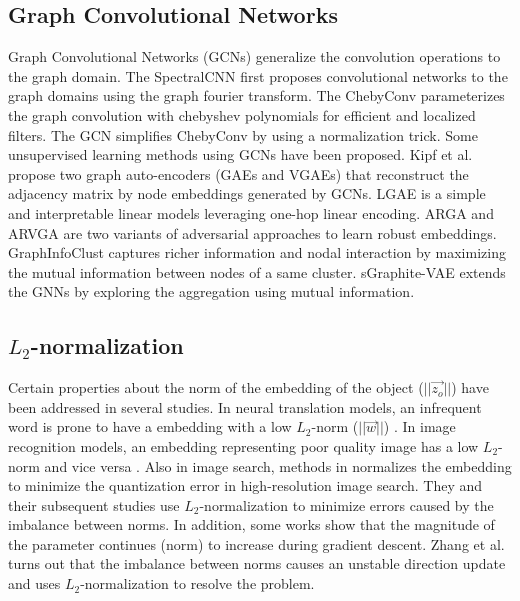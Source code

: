 \documentclass[sigconf]{acmart}
\begin{document}
\subsection{Graph Convolutional Networks}
Graph Convolutional Networks (GCNs) generalize the convolution operations to the graph domain.
The SpectralCNN \cite{bruna2013spectral} first proposes convolutional networks to the graph domains using the graph fourier transform.
The ChebyConv \cite{defferrard2016convolutional} parameterizes the graph convolution with chebyshev polynomials for efficient and localized filters.
The GCN \cite{kipf2016semi} simplifies ChebyConv by using a normalization trick.
Some unsupervised learning methods using GCNs have been proposed.
Kipf et al. \cite{kipf2016variational} propose two graph auto-encoders (GAEs and VGAEs) that reconstruct the adjacency matrix by node embeddings generated by GCNs.
LGAE \cite{salha2020simple} is a simple and interpretable linear models leveraging one-hop linear encoding.
ARGA and ARVGA \cite{pan2018adversarially} are two variants of adversarial approaches to learn robust embeddings.
GraphInfoClust \cite{mavromatis2020graph} captures richer information and nodal interaction by maximizing the mutual information between nodes of a same cluster.
sGraphite-VAE \cite{di2020mutual} extends the GNNs by exploring the aggregation using mutual information.



\subsection{$L_2$-normalization}
Certain properties about the norm of the embedding of the object ($||\vec{z_o}||$) have been addressed in several studies.
In neural translation models, an infrequent word is prone to have a embedding with a low $L_2$-norm ($||\vec{w}||$) \cite{kobayashi2020attention, arefyev2018much, schakel2015measuring, nguyen2017improving, nguyen2019transformers}.
In image recognition models, an embedding representing poor quality image has a low $L_2$-norm and vice versa \cite{liu2017sphereface,wang2018cosface}.
Also in image search, methods in \cite{wu2017multiscale, eghbali2019deep} normalizes the embedding to minimize the quantization error in high-resolution image search.
They and their subsequent studies use $L_2$-normalization \cite{ranjan2017l2,wang2017normface,zheng2018ring} to minimize errors caused by the imbalance between norms.
In addition, some works \cite{merrill2020parameter,nguyen2019transformers} show that the magnitude of the parameter continues (norm) to increase during gradient descent.
Zhang et al. \cite{zhang2020deep} turns out that the imbalance between norms causes an unstable direction update and uses $L_2$-normalization to resolve the problem.
\end{document}
